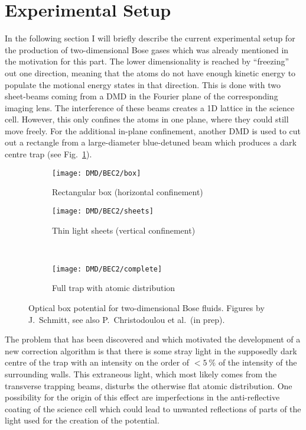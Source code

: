 \section{Experimental Setup}
\label{sec:dmd_experimental_setup}
In the following section I will briefly describe the current experimental setup for the production of two-dimensional Bose gases which was already mentioned in the motivation for this part. The lower dimensionality is reached by \enquote{freezing} out one direction, meaning that the atoms do not have enough kinetic energy to populate the motional energy states in that direction. This is done with two sheet-beams coming from a DMD in the Fourier plane of the corresponding imaging lens. The interference of these beams creates a 1D lattice in the science cell. However, this only confines the atoms in one plane, where they could still move freely. For the additional in-plane confinement, another DMD is used to cut out a rectangle from a large-diameter blue-detuned beam which produces a dark centre trap (see Fig.~\ref{fig:bec2_trap_setup}).
\begin{figure}[htbp]
    \centering
    \begin{subfigure}[t]{0.48\textwidth}
        \centering
        \texttt{[image: DMD/BEC2/box]}
        \caption{Rectangular box (horizontal confinement)}
    \end{subfigure}
    \begin{subfigure}[t]{0.48\textwidth}
        \centering
        \texttt{[image: DMD/BEC2/sheets]}
        \caption{Thin light sheets (vertical confinement)}
    \end{subfigure}
    \\ \vspace{1ex}
    \begin{subfigure}[t]{0.7\textwidth}
        \centering
        \texttt{[image: DMD/BEC2/complete]}
        \caption{Full trap with atomic distribution}
    \end{subfigure}
    \caption[Optical box potential for two-dimensional Bose fluids]{Optical box potential for two-dimensional Bose fluids. Figures by J.~Schmitt, see also P.~Christodoulou et al.\ (in prep).}
    \label{fig:bec2_trap_setup}
\end{figure}
The problem that has been discovered and which motivated the development of a new correction algorithm is that there is some stray light in the supposedly dark centre of the trap with an intensity on the order of $<\!\SI{5}{\percent}$ of the intensity of the surrounding walls. This extraneous light, which most likely comes from the transverse trapping beams, disturbs the otherwise flat atomic distribution. One possibility for the origin of this effect are imperfections in the anti-reflective coating of the science cell which could lead to unwanted reflections of parts of the light used for the creation of the potential.

